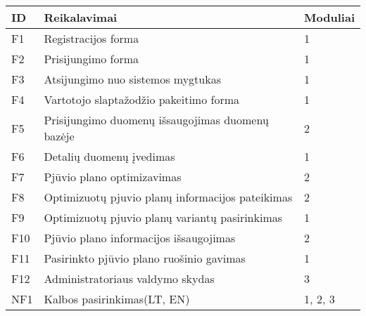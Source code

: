 \documentclass[a4paper,12pt]{article}
\begin{document}
\begin{frame}
\centering

\label{my-label}
\begin{tabular}{|l|l|l|}
\hline
\textbf{ID}              & \textbf{Reikalavimai}               & \textbf{Moduliai}  \\ \hline
F1                       & Registracijos forma                	   & 1      \\ \hline

F2                       & Prisijungimo forma                		   & 1      \\ \hline

F3						& Atsijungimo nuo sistemos mygtukas 	       & 1		\\ \hline

F4                       & Vartotojo slaptažodžio pakeitimo forma   & 1      \\ \hline

F5						& Prisijungimo duomenų išsaugojimas duomenų bazėje 
																   & 2		\\ \hline


F6                       & Detalių duomenų įvedimas           	   & 1            \\ \hline
F7                       & Pjūvio plano optimizavimas           	   & 2            \\ \hline

F8                       & Optimizuotų pjuvio planų informacijos pateikimas 																  						 & 2      \\ \hline

F9                       & Optimizuotų pjuvio planų variantų pasirinkimas 																   					   & 1      \\ \hline

F10                      & Pjūvio plano informacijos išsaugojimas 
															      & 2       \\ \hline

F11                      & Pasirinkto pjūvio plano ruošinio gavimas& 1       \\ \hline


F12						& Administratoriaus valdymo skydas	 	  & 3			\\ \hline


NF1                      & Kalbos pasirinkimas(LT, EN)       	     & 1, 2, 3                 \\ \hline
\end{tabular}
\end{frame}
\end{document}
